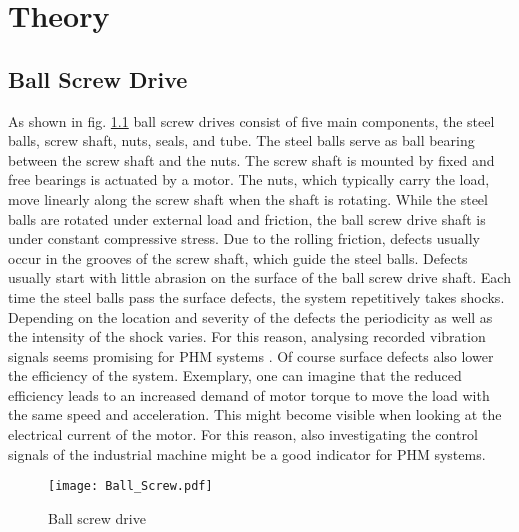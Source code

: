 \chapter{Theory}\label{chapter:theory}

\section{Ball Screw Drive}
As shown in fig. \ref{fig:Ball_Screw} ball screw drives consist of five main components, the steel balls, screw shaft, nuts, seals, and tube. The steel balls serve as ball bearing between the screw shaft and the nuts. The screw shaft is mounted by fixed and free bearings is actuated by a motor. The nuts, which typically carry the load, move linearly along the screw shaft when the shaft is rotating. While the steel balls are rotated under external load and friction, the ball screw drive shaft is under constant compressive stress. Due to the rolling friction, defects usually occur in the grooves of the screw shaft, which guide the steel balls. Defects usually start with little abrasion on the surface of the ball screw drive shaft. Each time the steel balls pass the surface defects, the system repetitively takes shocks. Depending on the location and severity of the defects the periodicity as well as the intensity of the shock varies. For this reason, analysing recorded vibration signals seems promising for PHM systems \cite{Lee2015}. Of course surface defects also lower the efficiency of the system. Exemplary, one can imagine that the reduced efficiency leads to an increased demand of motor torque to move the load with the same speed and acceleration. This might become visible when looking at the electrical current of the motor. For this reason, also investigating the control signals of the industrial machine might be a good indicator for PHM systems.

\begin{figure}[H]
  \centering
  \texttt{[image: Ball\_Screw.pdf]}
  \caption {Ball screw drive \cite{DENG2020}} \label{fig:Ball_Screw}
\end{figure}


